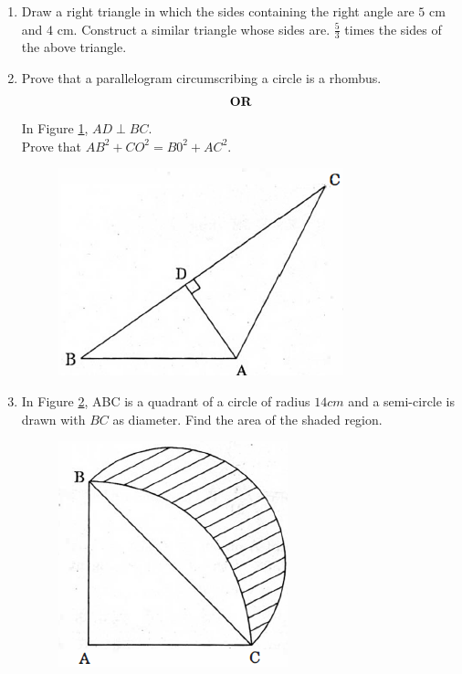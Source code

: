 \documentclass[journal,12pt,twocolumn]{IEEEtran}
\renewcommand\thesection{\arabic{section}}
\begin{document}
\begin{enumerate}[label=\thesection.\arabic*.,ref=\thesection.\theenumi]
\item Draw a right triangle in which the sides containing the right angle are $5$ cm and $4$ cm. Construct a similar triangle whose sides are. $\frac{5}{3}$ times the sides of the above triangle.\\
\item Prove that a parallelogram circumscribing a circle is a rhombus.
\begin{align}
	\centering \vec{OR}\nonumber
\end{align}
In Figure \ref{fig3}, $AD\perp BC$. \\Prove that $AB^2+CO^2=B0^2+AC^2$.\\
\begin{figure}[h!]
	\centering
    \includegraphics[width=0.5\columnwidth,center]{./fig/3.png}
	\caption{}
	\label{fig3}
\end{figure}
\item In Figure \ref{fig4}, ABC is a quadrant of a circle of radius $14 cm$ and a semi-circle is drawn with $BC$ as diameter. Find the area of the shaded region.
\begin{figure}[h!]
    \centering
    \includegraphics[width=0.5\columnwidth,center]{./fig/4.png}
    \caption{}
    \label{fig4}
\end{figure}
\end{enumerate}   
\end{document}
